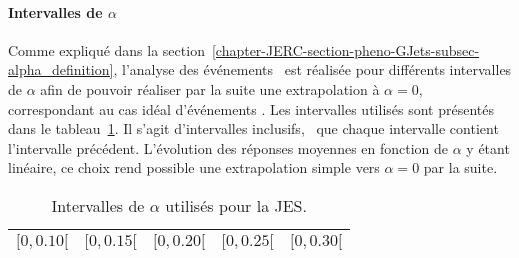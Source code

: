 \paragraph{Intervalles de $\alpha$}
Comme expliqué dans la section~\ref{chapter-JERC-section-pheno-GJets-subsec-alpha_definition}, l'analyse des événements \Gjets\ est réalisée pour différents intervalles de $\alpha$ afin de pouvoir réaliser par la suite une extrapolation à $\alpha=0$, correspondant au cas idéal d'événements \Gjet.
Les intervalles utilisés sont présentés dans le tableau~\ref{tab-alpha_intervalles}.
Il s'agit d'intervalles inclusifs, \ie\ que chaque intervalle contient l'intervalle précédent.
L'évolution des réponses moyennes en fonction de $\alpha$ y étant linéaire, ce choix rend possible une extrapolation simple vers $\alpha=0$ par la suite.
\begin{table}[h]
\centering
\begin{tabular}{ccccc}
\toprule
$[\num{0}, \num{0.10}[$ & $[\num{0}, \num{0.15}[$ & $[\num{0}, \num{0.20}[$ & $[\num{0}, \num{0.25}[$ & $[\num{0}, \num{0.30}[$ \\
\bottomrule
\end{tabular}
\caption{Intervalles de $\alpha$ utilisés pour la JES.}
\label{tab-alpha_intervalles}
\end{table}
